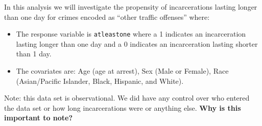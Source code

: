 \documentclass[
  ignorenonframetext,
]{beamer}
\providecommand{\tightlist}{%
  \setlength{\itemsep}{0pt}\setlength{\parskip}{0pt}}
\begin{document}
\begin{frame}[fragile]{}
\protect\hypertarget{section-4}{}
In this analysis we will investigate the propensity of incarcerations
lasting longer than one day for crimes encoded as ``other traffic
offenses'' where:

\begin{itemize}
\tightlist
\item
  The response variable is \texttt{atleastone} where a 1 indicates an
  incarceration lasting longer than one day and a 0 indicates an
  incarceration lasting shorter than 1 day.
\item
  The covariates are: Age (age at arrest), Sex (Male or Female), Race
  (Asian/Pacific Islander, Black, Hispanic, and White).
\end{itemize}

\vspace{12pt}

Note: this data set is observational. We did have any control over who
entered the data set or how long incarcerations were or anything else.
\textbf{Why is this important to note?}
\end{frame}
\end{document}
